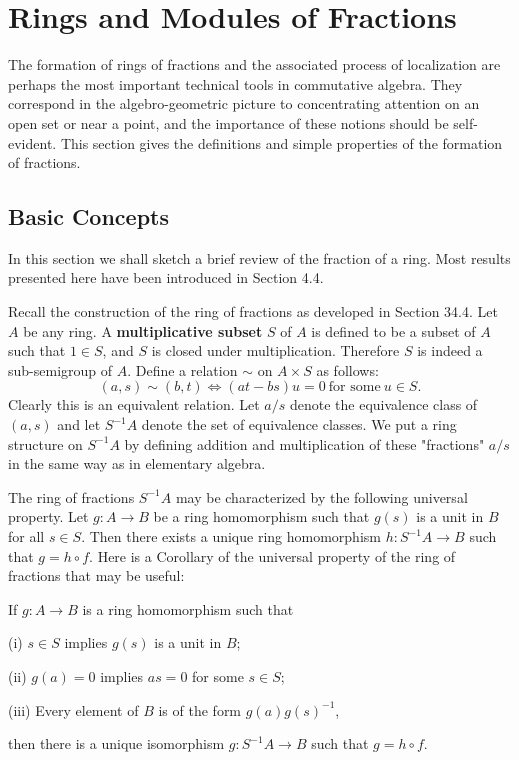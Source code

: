 \section{Rings and Modules of Fractions}
The formation of rings of fractions and the associated process of localization are perhaps the most important technical tools in commutative algebra. They correspond in the algebro-geometric picture to concentrating attention on an open set or near a point, and the importance of these notions should be self-evident. This section gives the definitions and simple properties of the formation of fractions.
\subsection{Basic Concepts}
In this section we shall sketch a brief review of the fraction of a ring. Most results presented here have been introduced in Section 4.4.\par
Recall the construction of the ring of fractions as developed in Section 34.4. Let $A$ be any ring. A \textbf{multiplicative subset} $S$ of $A$ is defined to be a subset of $A$ such that $1\in S$, and $S$ is closed under multiplication. Therefore $S$ is indeed a sub-semigroup of $A$. Define a relation $\sim$ on $A\times S$ as follows: 
$$(a,s)\sim (b,t)\iff (at-bs)u=0\ \text{for some}\ u\in S.$$
Clearly this is an equivalent relation. Let $a/s$ denote the equivalence class of $(a,s)$ and let $S^{-1}A$ denote the set of equivalence classes. We put a ring structure on $S^{-1}A$ by defining addition and multiplication of these "fractions" $a/s$ in the same way as in elementary algebra.\par
The ring of fractions $S^{-1}A$ may be characterized by the following universal property. Let $g:A\to B$ be a ring homomorphism such that $g(s)$ is a unit in $B$ for all $s\in S$. Then there exists a unique ring homomorphism $h:S^{-1}A\to B$ such that $g=h\circ f$. Here is a Corollary of the universal property of the ring of fractions that may be useful: 
\begin{corollary}
If $g:A\to B$ is a ring homomorphism such that \par
(i) $s\in S$ implies $g(s)$ is a unit in $B$;\par
(ii) $g(a)=0$ implies $as=0$ for some $s\in S$;\par
(iii) Every element of $B$ is of the form $g(a)g(s)^{-1}$,\par
then there is a unique isomorphism $g:S^{-1}A\to B$ such that $g=h\circ f$.
\end{corollary}
